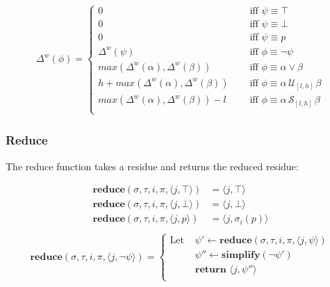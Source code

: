 \documentclass[10pt,a4paper]{article}
\newcommand{\rp}[2]{\ensuremath{\langle #1, #2 \rangle}}
\begin{document}
\begin{align*}
\Delta^w(\phi) = \left\lbrace
\begin{aligned}
0 & \quad \text{ iff } \psi \equiv \top \\
0 & \quad \text{ iff } \psi \equiv \bot \\
0 & \quad \text{ iff } \psi \equiv p \\
\Delta^w(\psi) & \quad \text{ iff } \phi \equiv \neg \psi \\
max(\Delta^w(\alpha),\Delta^w(\beta)) & \quad \text{ iff } \phi \equiv \alpha \vee \beta \\
h + max(\Delta^w(\alpha),\Delta^w(\beta)) & \quad \text{ iff } \phi \equiv \alpha\, \mathcal{U}_{[l,h]}\, \beta \\
max(\Delta^w(\alpha),\Delta^w(\beta)) - l & \quad \text{ iff } \phi \equiv \alpha\, \mathcal{S}_{[l,h]}\, \beta \\
\end{aligned} \right. 
\end{align*}

\subsubsection*{Reduce}
The reduce function takes a residue and returns the reduced residue:


\begin{align*}
\mathbf{reduce}(\sigma,\tau, i,\pi,\rp{j}{\top}) &= \rp{j}{\top} \\
\mathbf{reduce}(\sigma,\tau, i,\pi,\rp{j}{\bot}) &= \rp{j}{\bot} \\
\mathbf{reduce}(\sigma,\tau, i,\pi,\rp{j}{p}) &= \rp{j}{\sigma_i(p)} \\
\end{align*}
\begin{align*}
\mathbf{reduce}(\sigma,\tau, i,\pi,\rp{j}{\neg \psi}) = \left\{
\begin{aligned}
\text{Let } &\psi' \leftarrow \mathbf{reduce}(\sigma, \tau, i, \pi, \rp{j}{\psi}) \\
&\psi'' \leftarrow \mathbf{simplify}(\neg \psi') \\
&\textbf{return } \rp{j}{\psi''} \\
\end{aligned} \right. \\
\end{align*}
\end{document}
